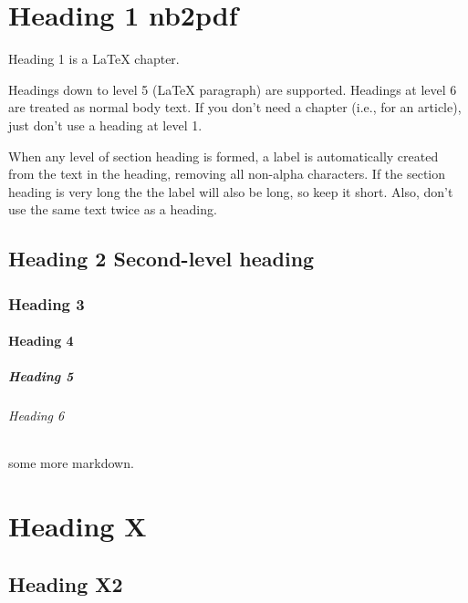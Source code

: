 \documentclass[english]{workpackage}[1996/06/02]
\begin{document}
\chapter{Heading 1 nb2pdf}
\label{sec:Heading1nb2pdf}


Heading 1 is a \LaTeX{} chapter.


Headings down to level 5 (\LaTeX{} paragraph) are supported. 
Headings at level 6 are treated as normal body text.
If you don't need a chapter (i.e., for an article), just don't use a heading at level 1.


When any level of section heading is formed, a label is automatically created from the text in the heading, removing all non-alpha characters.  If the section heading is very long the the label will also be long, so keep it short. Also, don't use the same text twice as a heading.




\section{Heading 2 Second-level heading}
\label{sec:Heading2Secondlevelheading}



\subsection{Heading 3}
\label{sec:Heading3}



\subsubsection{Heading 4}
\label{sec:Heading4}



\paragraph{Heading 5}
\label{sec:Heading5}



\subparagraph{Heading 6}
\label{sec:Heading6}


some more markdown.




\chapter{Heading X}
\label{sec:HeadingX}


\section{Heading X2}
\label{sec:HeadingX2}
\end{document}
